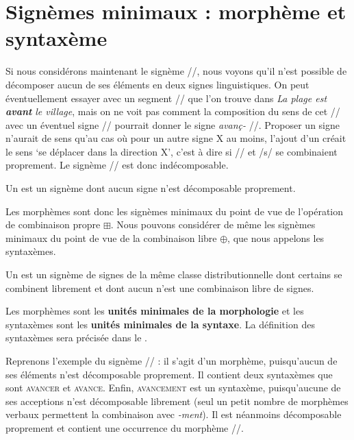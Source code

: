 \section{Signèmes minimaux : morphème et syntaxème}\label{sec:2.2.11}

Si nous considérons maintenant le signème //, nous voyons qu’il n’est possible de décomposer aucun de ses éléments en deux signes linguistiques. On peut éventuellement essayer avec un segment // que l’on trouve dans \textit{La plage est} \textbf{\textit{avant}} \textit{le village}, mais on ne voit pas comment la composition du sens de cet // avec un éventuel signe // pourrait donner le signe \textit{avanç-} //. Proposer un signe  n’aurait de sens qu’au cas où pour un autre signe X au moins, l’ajout d’un  créait le sens ‘se déplacer dans la direction X’, c’est à dire si // et /s/ se combinaient proprement. Le signème // est donc indécomposable.

\begin{styleLivreImportant}
Un  est un signème dont aucun signe n’est décomposable proprement.
\end{styleLivreImportant}

Les morphèmes sont donc les signèmes minimaux du point de vue de l’opération de combinaison propre ${\boxplus}$. Nous pouvons considérer de même les signèmes minimaux du point de vue de la combinaison libre ${\oplus}$, que nous appelons les syntaxèmes.

\begin{styleLivreImportant}
Un  est un signème de signes de la même classe distributionnelle dont certains se combinent librement et dont aucun n’est une combinaison libre de signes.
\end{styleLivreImportant}

Les morphèmes sont les \textbf{unités minimales de la morphologie} et les syntaxèmes sont les \textbf{unités minimales de la syntaxe}. La définition des syntaxèmes sera précisée dans le .

Reprenons l’exemple du signème // : il s’agit d’un morphème, puisqu’aucun de ses éléments n’est décomposable proprement. Il contient deux syntaxèmes que sont \textsc{avancer} et \textsc{avance}. Enfin, \textsc{avancement} est un syntaxème, puisqu’aucune de ses acceptions n’est décomposable librement (seul un petit nombre de morphèmes verbaux permettent la combinaison avec \textit{{}-ment}). Il est néanmoins décomposable proprement et contient une occurrence du morphème //.

